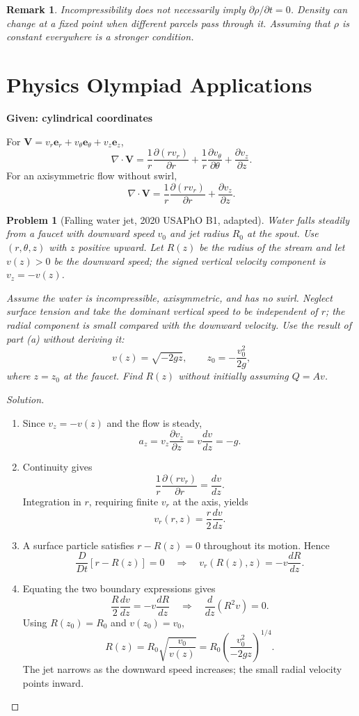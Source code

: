 \documentclass[11pt]{article}
\theoremstyle{plaincolon}
\theoremstyle{definitioncolon}
\newtheorem{problem}{Problem} %
\theoremstyle{remarkcolon}
\newtheorem{remark}[theorem]{Remark}
\newenvironment{solution}{\begin{proof}[Solution]}{\end{proof}}
\numberwithin{equation}{section}
\begin{document}
\begin{remark}
Incompressibility does not necessarily imply $\partial\rho/\partial t=0$. Density can change at a fixed point when different parcels pass through it. Assuming that $\rho$ is constant everywhere is a stronger condition.
\end{remark}

\section{Physics Olympiad Applications}

\begin{mathbox}
\textbf{Given: cylindrical coordinates}

For $\mathbf V=v_r\mathbf e_r+v_\theta\mathbf e_\theta+v_z\mathbf e_z$,
\[
\nabla\cdot\mathbf V=
\frac{1}{r}\frac{\partial(rv_r)}{\partial r}
+\frac{1}{r}\frac{\partial v_\theta}{\partial\theta}
+\frac{\partial v_z}{\partial z}.
\]
For an axisymmetric flow without swirl,
\[
\nabla\cdot\mathbf V=
\frac{1}{r}\frac{\partial(rv_r)}{\partial r}
+\frac{\partial v_z}{\partial z}.
\]
\end{mathbox}

\begin{problem}[Falling water jet, 2020 USAPhO B1, adapted]
Water falls steadily from a faucet with downward speed $v_0$ and jet radius $R_0$ at the spout. Use $(r,\theta,z)$ with $z$ positive upward. Let $R(z)$ be the radius of the stream and let $v(z)>0$ be the downward speed; the signed vertical velocity component is $v_z=-v(z)$.

Assume the water is incompressible, axisymmetric, and has no swirl. Neglect surface tension and take the dominant vertical speed to be independent of $r$; the radial component is small compared with the downward velocity. Use the result of part (a) without deriving it:
\[
v(z)=\sqrt{-2gz},\qquad z_0=-\frac{v_0^2}{2g},
\]
where $z=z_0$ at the faucet. Find $R(z)$ without initially assuming $Q=Av$.
\end{problem}

\begin{solution}
\begin{enumerate}
\item Since $v_z=-v(z)$ and the flow is steady,
\[
a_z=v_z\frac{\partial v_z}{\partial z}
=v\frac{dv}{dz}=-g.
\]
\item Continuity gives
\[
\frac1r\frac{\partial(rv_r)}{\partial r}=\frac{dv}{dz}.
\]
Integration in $r$, requiring finite $v_r$ at the axis, yields
\[
v_r(r,z)=\frac r2\frac{dv}{dz}.
\]
\item A surface particle satisfies $r-R(z)=0$ throughout its motion. Hence
\[
\frac D{Dt}[r-R(z)]=0
\quad\Longrightarrow\quad
v_r(R(z),z)=-v\frac{dR}{dz}.
\]
\item Equating the two boundary expressions gives
\[
\frac R2\frac{dv}{dz}=-v\frac{dR}{dz}
\quad\Longrightarrow\quad
\frac d{dz}(R^2v)=0.
\]
Using $R(z_0)=R_0$ and $v(z_0)=v_0$,
\[
\boxed{R(z)=R_0\sqrt{\frac{v_0}{v(z)}}=
R_0\left(\frac{v_0^2}{-2gz}\right)^{1/4}}.
\]
The jet narrows as the downward speed increases; the small radial velocity points inward.
\end{enumerate}
\end{solution}
\end{document}

